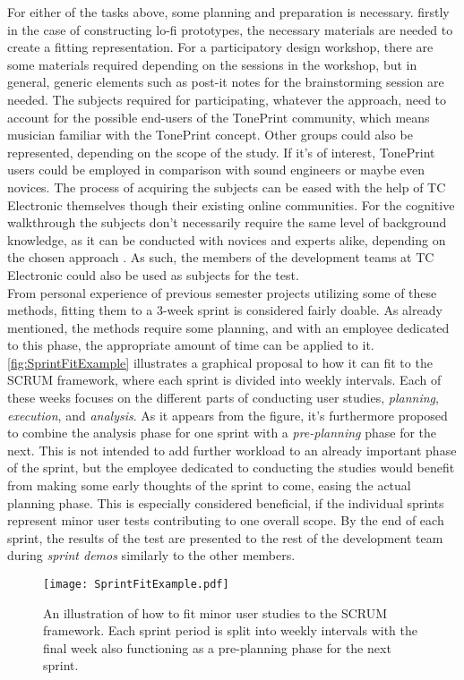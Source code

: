 \noindent
For either of the tasks above, some planning and preparation is necessary. firstly in the case of constructing lo-fi prototypes, the necessary materials are needed to create a fitting representation. For a participatory design workshop, there are some materials required depending on the sessions in the workshop, but in general, generic elements such as post-it notes for the brainstorming session are needed. The subjects required for participating, whatever the approach, need to account for the possible end-users of the TonePrint community, which means musician familiar with the TonePrint concept. Other groups could also be represented, depending on the scope of the study. If it's of interest, TonePrint users could be employed in comparison with sound engineers or maybe even novices. The process of acquiring the subjects can be eased with the help of TC Electronic themselves though their existing online communities. For the cognitive walkthrough the subjects don't necessarily require the same level of background knowledge, as it can be conducted with novices and experts alike, depending on the chosen approach \parencite{WEB:CognitiveWalkthrough}. As such, the members of the development teams at TC Electronic could also be used as subjects for the test.\\

\noindent
From personal experience of previous semester projects utilizing some of these methods, fitting them to a 3-week sprint is considered fairly doable. As already mentioned, the methods require some planning, and with an employee dedicated to this phase, the appropriate amount of time can be applied to it. \autoref{fig:SprintFitExample} illustrates a graphical proposal to how it can fit to the SCRUM framework, where each sprint is divided into weekly intervals. Each of these weeks focuses on the different parts of conducting user studies, \textit{planning}, \textit{execution}, and \textit{analysis}. As it appears from the figure, it's furthermore proposed to combine the analysis phase for one sprint with a \textit{pre-planning} phase for the next. This is not intended to add further workload to an already important phase of the sprint, but the employee dedicated to conducting the studies would benefit from making some early thoughts of the sprint to come, easing the actual planning phase. This is especially considered beneficial, if the individual sprints represent minor user tests contributing to one overall scope. By the end of each sprint, the results of the test are presented to the rest of the development team during \textit{sprint demos} similarly to the other members.
%
\begin{figure}[H]
	\centering
	\texttt{[image: SprintFitExample.pdf]}
	\caption{An illustration of how to fit minor user studies to the SCRUM framework. Each sprint period is split into weekly intervals with the final week also functioning as a pre-planning phase for the next sprint.}
	\label{fig:SprintFitExample}
\end{figure}


